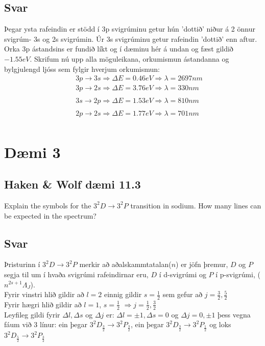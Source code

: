 \documentclass[11pt]{article}
\begin{document}
\subsection*{Svar}
Þegar ysta rafeindin er stödd í 3p svigrúminu getur hún 'dottið' niður á 2 önnur svigrúm- 3s og 2s svigrúmin. Úr 3s  svigrúminu getur rafeindin 'dottið' enn aftur. Orka 3p ástandsins er fundið líkt og í dæminu hér á undan og fæst gildið $-1.55eV$. Skrifum nú upp alla möguleikana, orkumismun ástandanna og bylgjulengd ljóss sem fylgir hverjum orkumismun:
\begin{align*}
&3p\rightarrow 3s \Rightarrow \Delta E = 0.46 eV \Rightarrow \lambda = 2697nm\\
&3p\rightarrow 2s \Rightarrow \Delta E = 3.76 eV \Rightarrow \lambda = 330nm\\
\quad\\
&3s\rightarrow 2p \Rightarrow \Delta E = 1.53 eV \Rightarrow \lambda = 810nm\\
\quad\\
&2p\rightarrow 2s \Rightarrow \Delta E = 1.77 eV \Rightarrow \lambda = 701nm\\
\end{align*}





\section*{Dæmi 3}
\subsection*{Haken \& Wolf dæmi 11.3}
Explain the symbols for the $3^2D\rightarrow 3^2P$ transition in sodium. How many lines can be expected in the spectrum?
\subsection*{Svar}
Þristurinn í $3^2D\rightarrow 3^2P$ merkir að aðalskammtatalan($n$) er jöfn þremur, $D$ og $P$ segja til um í hvaða svigrúmi rafeindirnar eru, $D$ í d-svigrúmi og $P$ í p-svigrúmi, ($n ^{2s+1}\Lambda_J$).\\
Fyrir vinstri hlið gildir að $l=2$ einnig gildir $s=\frac 12$ sem gefur að $j=\frac
32 , \frac 52$\\
Fyrir hægri hlið gildir að $l=1$, $s=\frac 12$ $\Rightarrow j = \frac 12, \frac 32$\\
Leyfileg gildi fyrir $\Delta l, \Delta s$ og $\Delta j$ er: $\Delta l = \pm 1, \Delta s = 0$ og $\Delta j = 0,\pm 1$ þess vegna fáum við 3 línur: ein þegar $3^2D_\frac{3}{2} \rightarrow 3^2P_\frac{3}{2}$, ein þegar $3^2D_\frac{3}{2} \rightarrow 3^2P_\frac{1}{2}$ og loks $3^2D_\frac{5}{2} \rightarrow 3^2P_\frac{3}{2}$
\end{document}
